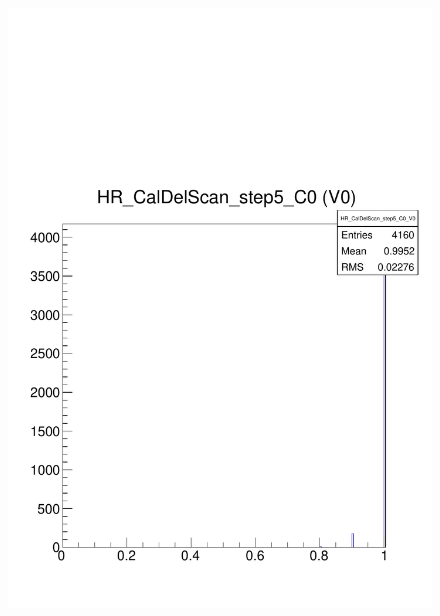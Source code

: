 \documentclass[a4paper,12pt,twoside]{article}
\begin{document}
\begin{figure} [h!]
\centering
\begin{minipage}{.48\textwidth}
  \centering
  \includegraphics[width=\textwidth]{./CalDel_Step5.pdf}
  \label{CalDel-Step5}
\end{minipage}%
\hspace{2mm}
\begin{minipage}{.48\textwidth}
  \centering

\end{minipage}
\end{figure}
\end{document}
